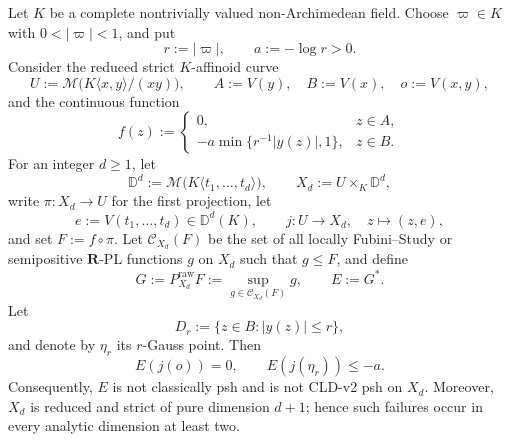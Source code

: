 
\begin{proposition}
\label{prop:p031-nodal-product-envelope-obstruction-candidate}
Let \(K\) be a complete nontrivially valued non-Archimedean field.  Choose
\(\varpi\in K\) with \(0<|\varpi|<1\), and put
\[
                  r:=|\varpi|,
          \qquad  a:=-\log r>0.
\]
Consider the reduced strict \(K\)-affinoid curve
\[
 U:=\mathcal M\bigl(K\langle x,y\rangle/(xy)\bigr),
 \qquad
 A:=V(y),\quad B:=V(x),\quad o:=V(x,y),
\]
and the continuous function
\[
 f(z):=
 \begin{cases}
  0,
       & z\in A,\\[2mm]
  -a\min\{r^{-1}|y(z)|,1\},
       & z\in B.
 \end{cases}
\]
For an integer \(d\geq1\), let
\[
 \mathbb D^d:=\mathcal M\bigl(K\langle t_1,\ldots,t_d\rangle\bigr),
 \qquad
 X_d:=U\times_K\mathbb D^d,
\]
write \(\pi:X_d\to U\) for the first projection, let
\[
 e:=V(t_1,\ldots,t_d)\in\mathbb D^d(K),
 \qquad
 j:U\longrightarrow X_d,\quad z\longmapsto(z,e),
\]
and set \(F:=f\circ\pi\).  Let \(\mathcal C_{X_d}(F)\) be the set of all
locally Fubini--Study or semipositive \(\mathbf R\)-PL functions \(g\) on
\(X_d\) such that \(g\leq F\), and define
\[
            G:=P_{X_d}^{\mathrm{raw}}F
              :=\sup_{g\in\mathcal C_{X_d}(F)}g,
            \qquad E:=G^*.
\]
Let
\[
 D_r:=\{z\in B:|y(z)|\leq r\},
\]
and denote by \(\eta_r\) its \(r\)-Gauss point.  Then
\[
                         E(j(o))=0,
              \qquad E(j(\eta_r))\leq-a.
\]
Consequently, \(E\) is not classically psh and is not CLD-v2 psh on
\(X_d\).  Moreover, \(X_d\) is reduced and strict of pure dimension
\(d+1\); hence such failures occur in every analytic dimension at least
two.
\end{proposition}

